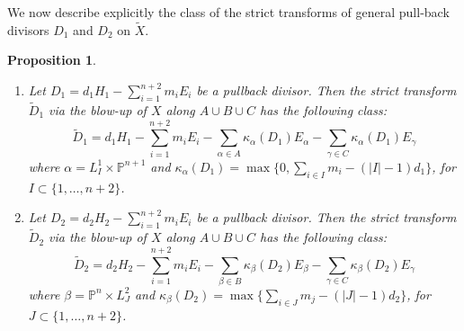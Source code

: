 \documentclass[a4paper,11pt]{article}
\newtheorem{proposition}[theorem]{Proposition}
\newcommand{\PP}{\mathbb P}
\begin{document}
We now describe explicitly the class of the strict transforms of general pull-back divisors $D_1$ and $D_2$ on $\tilde{X}$.
\begin{proposition}\label{prop:stricttransform}
\begin{enumerate}
\item Let $D_1=d_1H_1-\sum_{i=1}^{n+2}m_iE_i$ be a pullback divisor.
Then the strict transform $\widetilde{D}_1$ via the blow-up of $X$ along $A\cup B\cup C$ has the following class:
$$
\widetilde{D}_1=d_1H_1-\sum_{i=1}^{n+2}m_i E_i-\sum_{\alpha\in A}\kappa_\alpha(D_1)E_\alpha-\sum_{\gamma\in C}\kappa_\alpha(D_1)E_\gamma
$$
where $\alpha=L^1_I\times\PP^{n+1}$ and $\kappa_\alpha(D_1)=\max\{0,\sum_{i\in I}m_i-(|I|-1)d_1\}$, for  $I\subset\{1,\dots,n+2\}$.

\item Let $D_2=d_2H_2-\sum_{i=1}^{n+2}m_iE_i$ be a pullback divisor.
Then the strict transform $\widetilde{D}_2$ via the blow-up of $X$ along $A\cup B\cup C$ has the following class:
$$
\widetilde{D}_2=d_2H_2-\sum_{i=1}^{n+2}m_i E_i-\sum_{\beta\in B}\kappa_\beta(D_2)E_\beta-\sum_{\gamma\in C}\kappa_\beta(D_2)E_\gamma
$$
where $\beta=\PP^{n}\times L^2_J $ and $\kappa_\beta(D_2)=\max\{\sum_{i \in J}m_j-(|J|-1)d_2\}$, for  $J\subset\{1,\dots,n+2\}$.
\end{enumerate}
\end{proposition}
\end{document}

